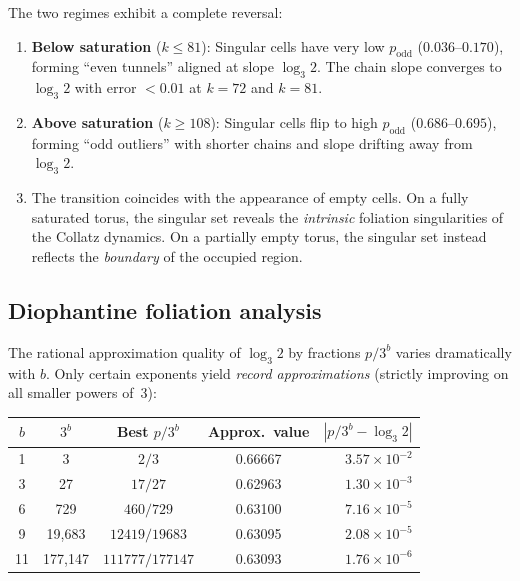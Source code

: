 \documentclass[11pt,a4paper]{article}
\theoremstyle{plain}
\theoremstyle{definition}
\begin{document}
\begin{keyinsight}
    The two regimes exhibit a complete reversal:
    \begin{enumerate}[label=(\roman*)]
        \item \textbf{Below saturation} ($k \leq 81$): Singular cells
        have very low $p_{\mathrm{odd}}$ ($0.036$--$0.170$), forming
        ``even tunnels'' aligned at slope $\log_3 2$.  The chain slope
        converges to $\log_3 2$ with error $< 0.01$ at $k = 72$ and
        $k = 81$.

        \item \textbf{Above saturation} ($k \geq 108$): Singular cells
        flip to high $p_{\mathrm{odd}}$ ($0.686$--$0.695$), forming
        ``odd outliers'' with shorter chains and slope drifting away from
        $\log_3 2$.

        \item The transition coincides with the appearance of empty cells.
        On a fully saturated torus, the singular set reveals the
        \emph{intrinsic} foliation singularities of the Collatz dynamics.
        On a partially empty torus, the singular set instead reflects the
        \emph{boundary} of the occupied region.
    \end{enumerate}
\end{keyinsight}


\subsection{Diophantine foliation analysis}

The rational approximation quality of $\log_3 2$ by fractions
$p/3^b$ varies dramatically with $b$.  Only certain exponents yield
\emph{record approximations} (strictly improving on all smaller powers
of~3):

\begin{center}
\begin{tabular}{ccccr}
\toprule
$b$ & $3^b$ & Best $p/3^b$ & Approx.\ value & $|p/3^b - \log_3 2|$ \\
\midrule
1  & 3       & $2/3$        & 0.66667 & $3.57 \times 10^{-2}$ \\
3  & 27      & $17/27$      & 0.62963 & $1.30 \times 10^{-3}$ \\
6  & 729     & $460/729$    & 0.63100 & $7.16 \times 10^{-5}$ \\
9  & 19{,}683 & $12419/19683$ & 0.63095 & $2.08 \times 10^{-5}$ \\
11 & 177{,}147 & $111777/177147$ & 0.63093 & $1.76 \times 10^{-6}$ \\
\bottomrule
\end{tabular}
\end{center}
\end{document}
